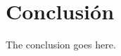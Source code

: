\documentclass[journal]{IEEEtran}
\begin{document}
%


\section{Conclusión}

The conclusion goes here.



%
\end{document}
